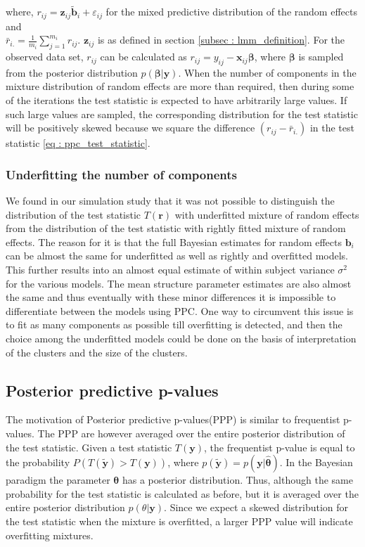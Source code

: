 where, $r_{ij} = \boldsymbol{z}_{ij}\boldsymbol{\tilde{b}}_i + \varepsilon_{ij}$ for the mixed predictive distribution of the random effects and\\ $\bar{r}_{i.} = \frac 1 {m_i} \sum_{j=1}^{m_i} r_{ij}$. $\boldsymbol{z}_{ij}$ is as defined in section \ref{subsec : lmm_definition}. For the observed data set, $r_{ij}$ can be calculated as $r_{ij} = y_{ij} - \boldsymbol{x}_{ij}\boldsymbol{\beta}$, where $\boldsymbol{\beta}$ is sampled from the posterior distribution $p(\boldsymbol{\beta}|\boldsymbol{y})$. When the number of components in the mixture distribution of random effects are more than required, then during some of the iterations the test statistic is expected to have arbitrarily large values. If such large values are sampled, the corresponding distribution for the test statistic will be positively skewed because we square the difference $(r_{ij}-\bar{r}_{i.})$ in the test statistic \ref{eq : ppc_test_statistic}.

\subsubsection{Underfitting the number of components}
We found in our simulation study that it was not possible to distinguish the distribution of the test statistic $T(\boldsymbol{r})$ with underfitted mixture of random effects from the distribution of the test statistic with rightly fitted mixture of random effects. The reason for it is that the full Bayesian estimates for random effects $\boldsymbol{b}_i$ can be almost the same for underfitted as well as rightly and overfitted models. This further results into an almost equal estimate of within subject variance $\sigma^2$ for the various models. The mean structure parameter estimates are also almost the same and thus eventually with these minor differences it is impossible to differentiate between the models using PPC. One way to circumvent this issue is to fit as many components as possible till overfitting is detected, and then the choice among the underfitted models could be done on the basis of interpretation of the clusters and the size of the clusters.
 
\subsection{Posterior predictive p-values}
The motivation of Posterior predictive p-values(PPP) is similar to frequentist p-values. The PPP are however averaged over the entire posterior distribution of the test statistic. Given a test statistic $T(\boldsymbol{y})$, the frequentist p-value is equal to the probability $P(T(\boldsymbol{\tilde{y}}) > T(\boldsymbol{y}))$, where $p(\boldsymbol{\tilde{y}}) = p(\boldsymbol{y}|\boldsymbol{\hat{\theta}})$. In the Bayesian paradigm the parameter $\boldsymbol{\theta}$ has a posterior distribution. Thus, although the same probability for the test statistic is calculated as before, but it is averaged over the entire posterior distribution $p(\theta|\boldsymbol{y})$. Since we expect a skewed distribution for the test statistic when the mixture is overfitted, a larger PPP value will indicate overfitting mixtures.

